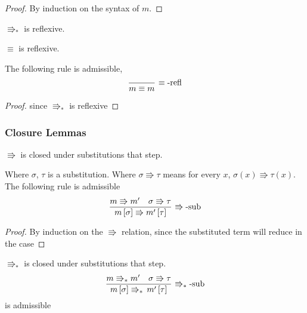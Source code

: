 \begin{proof}
By induction on the syntax of $m$.
\end{proof}
\begin{fact}
$\Rrightarrow_{\ast}$ is reflexive.
\end{fact}
 
\begin{lem}
$\equiv$ is reflexive.
 
The following rule is admissible,
\[
\frac{\,}{m\equiv m}\,\operatorname{\equiv-refl}
\]
\end{lem}
 
\begin{proof}
since $\Rrightarrow_{\ast}$ is reflexive
\end{proof}
 
\subsubsection{Closure Lemmas}
 
 
 
\begin{lem}
$\Rrightarrow$ is closed under substitutions that step.
 
Where $\sigma$, $\tau$ is a substitution.
Where $\sigma\Rrightarrow\tau$ means for every $x$, $\sigma\left(x\right)\Rrightarrow\tau\left(x\right)$.
The following rule is admissible
\[
\frac{m\Rrightarrow m'\quad\sigma\Rrightarrow\tau}{m\left[\sigma\right]\Rrightarrow m'\left[\tau\right]}\,\operatorname{\Rrightarrow-sub}
\]
\end{lem}
\begin{proof}
By induction on the $\Rrightarrow$ relation, since the substituted term will reduce in the  case
\end{proof}
 
\begin{lem}
$\Rrightarrow_{\ast}$ is closed under substitutions that step.
\[
\frac{m\Rrightarrow_{\ast}m'\quad\sigma\Rrightarrow\tau}{m\left[\sigma\right]\Rrightarrow_{\ast}\,m'\left[\tau\right]}\,\operatorname{\Rrightarrow_{\ast}-sub}
\]
is admissible
\end{lem}
 
